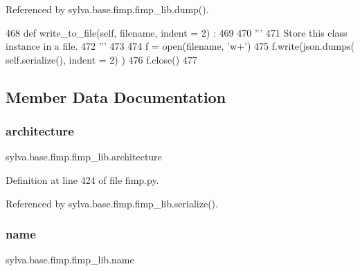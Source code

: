 Referenced by sylva.\+base.\+fimp.\+fimp\+\_\+lib.\+dump().


\begin{DoxyCode}
468     \textcolor{keyword}{def }write\_to\_file(self, filename, indent = 2) :
469 
470       \textcolor{stringliteral}{'''}
471 \textcolor{stringliteral}{        Store this class instance in a file.}
472 \textcolor{stringliteral}{      '''}
473 
474       f = open(filename, \textcolor{stringliteral}{'w+'})
475       f.write(json.dumps( self.serialize(), indent = 2) )
476       f.close()
477 
\end{DoxyCode}


\subsection{Member Data Documentation}
\mbox{\label{classsylva_1_1base_1_1fimp_1_1fimp__lib_a8286e3fa2d4188bfa83f4130959a8907}} 
\subsubsection{\texorpdfstring{architecture}{architecture}}
{\footnotesize\ttfamily sylva.\+base.\+fimp.\+fimp\+\_\+lib.\+architecture}



Definition at line 424 of file fimp.\+py.



Referenced by sylva.\+base.\+fimp.\+fimp\+\_\+lib.\+serialize().

\mbox{\label{classsylva_1_1base_1_1fimp_1_1fimp__lib_aeb997b1d0dcc07395898b441609aa898}} 
\subsubsection{\texorpdfstring{name}{name}}
{\footnotesize\ttfamily sylva.\+base.\+fimp.\+fimp\+\_\+lib.\+name}



